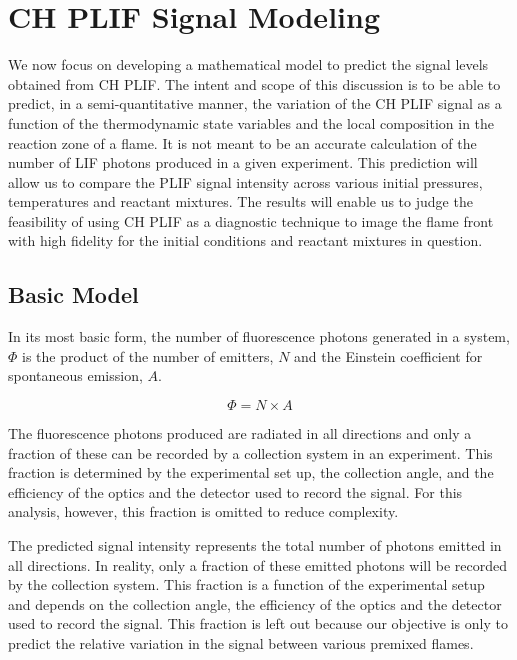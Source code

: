 \section{CH PLIF Signal Modeling}
\label{sec:background-chplif-signal-modeling}

We now focus on developing a mathematical model to predict the signal levels obtained from CH PLIF.
The intent and scope of this discussion is to be able to predict, in a semi-quantitative manner, the variation of the CH PLIF signal as a function of the thermodynamic state variables and the local composition in the reaction zone of a flame.
It is not meant to be an accurate calculation of the number of LIF photons produced in a given experiment.
This prediction will allow us to compare the PLIF signal intensity across various initial pressures, temperatures and reactant mixtures.
The results will enable us to judge the feasibility of using CH PLIF as a diagnostic technique to image the flame front with high fidelity for the initial conditions and reactant mixtures in question.

\subsection{Basic Model}
\label{subsec:chplif-basic-model}

In its most basic form, the number of fluorescence photons generated in a system, \(\Phi\) is the product of the number of emitters, \(N\) and the Einstein coefficient for spontaneous emission, \(A\).

\begin{equation}
  \Phi = N\times A
  \label{eqn:fluorescencePhotons}
\end{equation}

The fluorescence photons produced are radiated in all directions and only a fraction of these can be recorded by a collection system in an experiment.
This fraction is determined by the experimental set up, the collection angle, and the efficiency of the optics and the detector used to record the signal.
For this analysis, however, this fraction is omitted to reduce complexity.

The predicted signal intensity represents the total number of photons emitted in all directions.
In reality, only a fraction of these emitted photons will be recorded by the collection system.
This fraction is a function of the experimental setup and depends on the collection angle, the efficiency of the optics and the detector used to record the signal.
This fraction is left out because our objective is only to predict the relative variation in the signal between various premixed flames.

